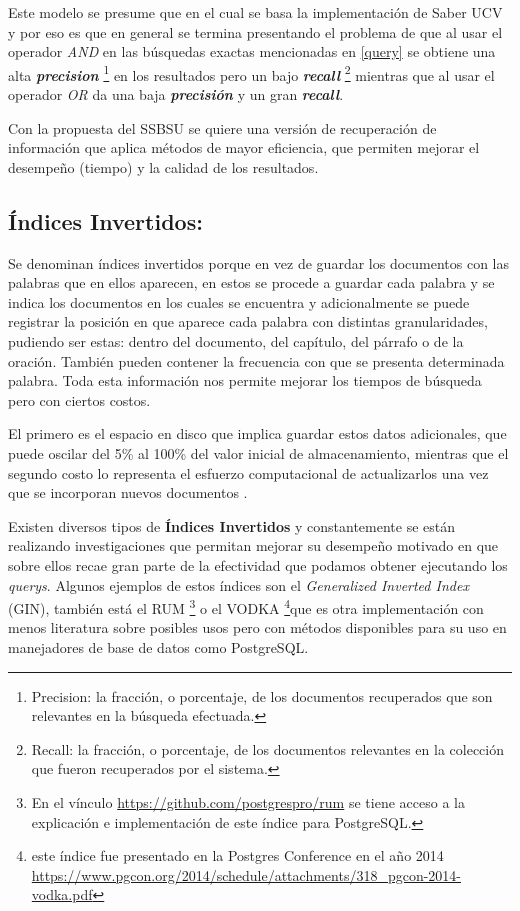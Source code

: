 \documentclass[
  10,
  openany]{book}
\begin{document}
Este modelo se presume que en el cual se basa la implementación de Saber UCV y por eso es que en general se termina presentando el problema de que al usar el operador \emph{AND} en las búsquedas exactas mencionadas en \ref{query} se obtiene una alta \textbf{\emph{precision}} \footnote{Precision: la fracción, o porcentaje, de los documentos recuperados que son relevantes en la búsqueda efectuada.} en los resultados pero un bajo \textbf{\emph{recall}} \footnote{Recall: la fracción, o porcentaje, de los documentos relevantes en la colección que fueron recuperados por el sistema.} mientras que al usar el operador \emph{OR} da una baja \textbf{\emph{precisión}} y un gran \textbf{\emph{recall}}.

Con la propuesta del SSBSU se quiere una versión de recuperación de información que aplica métodos de mayor eficiencia, que permiten mejorar el desempeño (tiempo) y la calidad de los resultados.

\hypertarget{invind}{%
\subsection{Índices Invertidos:}\label{invind}}

Se denominan índices invertidos porque en vez de guardar los documentos con las palabras que en ellos aparecen, en estos se procede a guardar cada palabra y se indica los documentos en los cuales se encuentra y adicionalmente se puede registrar la posición en que aparece cada palabra con distintas granularidades, pudiendo ser estas: dentro del documento, del capítulo, del párrafo o de la oración. También pueden contener la frecuencia con que se presenta determinada palabra. Toda esta información nos permite mejorar los tiempos de búsqueda pero con ciertos costos.

El primero es el espacio en disco que implica guardar estos datos adicionales, que puede oscilar del 5\% al 100\% del valor inicial de almacenamiento, mientras que el segundo costo lo representa el esfuerzo computacional de actualizarlos una vez que se incorporan nuevos documentos \citep{Mahapatra2011}.

Existen diversos tipos de \textbf{Índices Invertidos} y constantemente se están realizando investigaciones que permitan mejorar su desempeño motivado en que sobre ellos recae gran parte de la efectividad que podamos obtener ejecutando los \emph{querys}. Algunos ejemplos de estos índices son el \emph{Generalized Inverted Index} (GIN), también está el RUM \footnote{En el vínculo \url{https://github.com/postgrespro/rum} se tiene acceso a la explicación e implementación de este índice para PostgreSQL.} o el VODKA \footnote{este índice fue presentado en la Postgres Conference en el año 2014 \url{https://www.pgcon.org/2014/schedule/attachments/318_pgcon-2014-vodka.pdf}}que es otra implementación con menos literatura sobre posibles usos pero con métodos disponibles para su uso en manejadores de base de datos como PostgreSQL.
\end{document}
